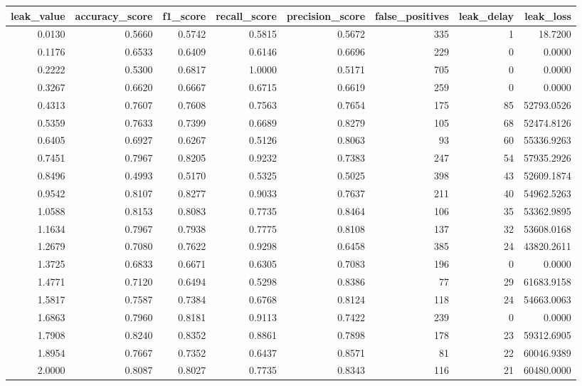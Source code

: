 \begin{tabular}{rrrrrrrr}
\toprule
leak\_value & accuracy\_score & f1\_score & recall\_score & precision\_score & false\_positives & leak\_delay & leak\_loss \\
\midrule
0.0130 & 0.5660 & 0.5742 & 0.5815 & 0.5672 & 335 & 1 & 18.7200 \\
0.1176 & 0.6533 & 0.6409 & 0.6146 & 0.6696 & 229 & 0 & 0.0000 \\
0.2222 & 0.5300 & 0.6817 & 1.0000 & 0.5171 & 705 & 0 & 0.0000 \\
0.3267 & 0.6620 & 0.6667 & 0.6715 & 0.6619 & 259 & 0 & 0.0000 \\
0.4313 & 0.7607 & 0.7608 & 0.7563 & 0.7654 & 175 & 85 & 52793.0526 \\
0.5359 & 0.7633 & 0.7399 & 0.6689 & 0.8279 & 105 & 68 & 52474.8126 \\
0.6405 & 0.6927 & 0.6267 & 0.5126 & 0.8063 & 93 & 60 & 55336.9263 \\
0.7451 & 0.7967 & 0.8205 & 0.9232 & 0.7383 & 247 & 54 & 57935.2926 \\
0.8496 & 0.4993 & 0.5170 & 0.5325 & 0.5025 & 398 & 43 & 52609.1874 \\
0.9542 & 0.8107 & 0.8277 & 0.9033 & 0.7637 & 211 & 40 & 54962.5263 \\
1.0588 & 0.8153 & 0.8083 & 0.7735 & 0.8464 & 106 & 35 & 53362.9895 \\
1.1634 & 0.7967 & 0.7938 & 0.7775 & 0.8108 & 137 & 32 & 53608.0168 \\
1.2679 & 0.7080 & 0.7622 & 0.9298 & 0.6458 & 385 & 24 & 43820.2611 \\
1.3725 & 0.6833 & 0.6671 & 0.6305 & 0.7083 & 196 & 0 & 0.0000 \\
1.4771 & 0.7120 & 0.6494 & 0.5298 & 0.8386 & 77 & 29 & 61683.9158 \\
1.5817 & 0.7587 & 0.7384 & 0.6768 & 0.8124 & 118 & 24 & 54663.0063 \\
1.6863 & 0.7960 & 0.8181 & 0.9113 & 0.7422 & 239 & 0 & 0.0000 \\
1.7908 & 0.8240 & 0.8352 & 0.8861 & 0.7898 & 178 & 23 & 59312.6905 \\
1.8954 & 0.7667 & 0.7352 & 0.6437 & 0.8571 & 81 & 22 & 60046.9389 \\
2.0000 & 0.8087 & 0.8027 & 0.7735 & 0.8343 & 116 & 21 & 60480.0000 \\
\bottomrule
\end{tabular}
